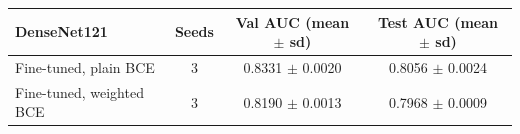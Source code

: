 \begin{tabular}{lccc}
\toprule
DenseNet121 & Seeds & Val AUC (mean $\pm$ sd) & Test AUC (mean $\pm$ sd) \\
\midrule
Fine-tuned, plain BCE & 3 & 0.8331 $\pm$ 0.0020 & 0.8056 $\pm$ 0.0024 \\
Fine-tuned, weighted BCE & 3 & 0.8190 $\pm$ 0.0013 & 0.7968 $\pm$ 0.0009 \\
\bottomrule
\end{tabular}

